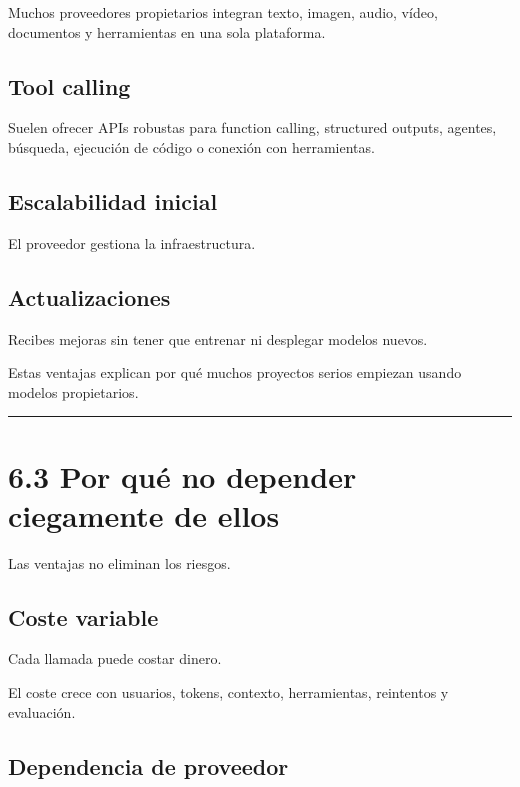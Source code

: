 Muchos proveedores propietarios integran texto, imagen, audio, vídeo,
documentos y herramientas en una sola plataforma.

\subsection{Tool calling}\label{tool-calling-3}

Suelen ofrecer APIs robustas para function calling, structured outputs,
agentes, búsqueda, ejecución de código o conexión con herramientas.

\subsection{Escalabilidad inicial}\label{escalabilidad-inicial}

El proveedor gestiona la infraestructura.

\subsection{Actualizaciones}\label{actualizaciones}

Recibes mejoras sin tener que entrenar ni desplegar modelos nuevos.

Estas ventajas explican por qué muchos proyectos serios empiezan usando
modelos propietarios.

\begin{center}\rule{0.5\linewidth}{0.5pt}\end{center}

\section{6.3 Por qué no depender ciegamente de
ellos}\label{por-quuxe9-no-depender-ciegamente-de-ellos}

Las ventajas no eliminan los riesgos.

\subsection{Coste variable}\label{coste-variable}

Cada llamada puede costar dinero.

El coste crece con usuarios, tokens, contexto, herramientas, reintentos
y evaluación.

\subsection{Dependencia de proveedor}\label{dependencia-de-proveedor}

